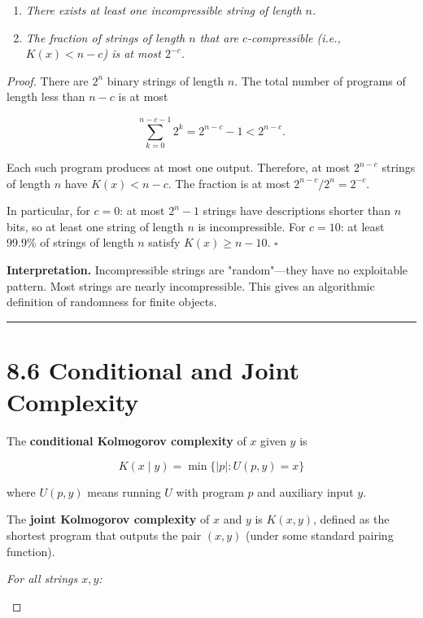 \begin{enumerate}
  \item \textit{There exists at least one incompressible string of length $n$.}
  \item \textit{The fraction of strings of length $n$ that are $c$-compressible (i.e., $K(x) < n - c$) is at most $2^{-c}$.}
\end{enumerate}

\begin{proof} There are $2^n$ binary strings of length $n$. The total number of programs of length less than $n - c$ is at most

\[
\sum_{k=0}^{n-c-1} 2^k = 2^{n-c} - 1 < 2^{n-c}.
\]

Each such program produces at most one output. Therefore, at most $2^{n-c}$ strings of length $n$ have $K(x) < n - c$. The fraction is at most $2^{n-c}/2^n = 2^{-c}$.

In particular, for $c = 0$: at most $2^n - 1$ strings have descriptions shorter than $n$ bits, so at least one string of length $n$ is incompressible. For $c = 10$: at least 99.9\% of strings of length $n$ satisfy $K(x) \geq n - 10$. $\square$

\textbf{Interpretation.} Incompressible strings are "random"—they have no exploitable pattern. Most strings are nearly incompressible. This gives an algorithmic definition of randomness for finite objects.

\bigskip\hrule\bigskip

\section{8.6 Conditional and Joint Complexity}

\begin{definition}
The \textbf{conditional Kolmogorov complexity} of $x$ given $y$ is

\[
K(x \mid y) = \min\{ |p| : U(p, y) = x\} 
\]

where $U(p, y)$ means running $U$ with program $p$ and auxiliary input $y$.
\end{definition}

\begin{definition}
The \textbf{joint Kolmogorov complexity} of $x$ and $y$ is $K(x, y)$, defined as the shortest program that outputs the pair $(x, y)$ (under some standard pairing function).
\end{definition}

\begin{theorem}
\textit{For all strings $x, y$:}


\end{theorem}
\end{proof}
